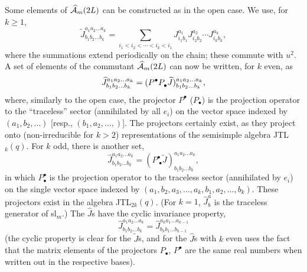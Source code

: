 \documentclass[twocolumn,floats,pra]{revtex4}
\def \hcA {\widehat{\cal A}}
\newcommand {\be}{\begin{equation}}
\newcommand {\ee} {\end{equation}}
\begin{document}
Some elements of $\hcA_m(2L)$ can be constructed as in the open
case. We use, for $k\geq 1$,
\be%
\widetilde{J}^{a_1a_2\ldots a_k}_{b_1b_2\ldots b_k}=\sum_{
i_1<i_2<\cdots <i_k<i_1} J_{i_1 b_1}^{a_1}J_{i_2
b_2}^{a_2}\cdots J_{i_k b_k}^{a_k}, \ee%
where the summations extend periodically on the chain; these
commute with $u^2$. A set of elements of the commutant
$\hcA_m(2L)$ can now be written, for $k$ even, as
\be%
\widehat{J}^{a_1a_2\ldots a_k}_{b_1b_2\ldots b_k}=(P^\bullet
P_{\bullet}^{\vphantom\bullet}
\widetilde{J})^{a_1a_2\ldots a_k}_{b_1b_2\ldots b_k},\ee%
where, similarly to the open case, the projector $P^\bullet$
($P_\bullet$) is the projection operator to the ``traceless''
sector (annihilated by all $e_i$) on the vector space indexed by
$(a_1,b_2,\ldots)$ [resp., $(b_1,a_2,\ldots,)$]. The projectors
certainly exist, as they project onto (non-irreducible for $k>2$)
representations of the semisimple algebra JTL$_{k}(q)$. For $k$
odd, there is another set,%
\be%
\widehat{J}^{a_1a_2\ldots a_k}_{b_1b_2\ldots
b_k}=(P^\bullet_{\;\bullet}
\widetilde{J})^{a_1a_2\ldots a_k}_{b_1b_2\ldots b_k},\ee%
in which $P^\bullet_\bullet$ is the projection operator to the
traceless sector (annihilated by $e_i$) on the single vector space
indexed by $(a_1,b_2,a_3,\ldots,a_k,b_1,a_2,\ldots,b_k)$. These
projectors exist in the algebra JTL$_{2k}(q)$. (For $k=1$,
$\widehat{J}^a_b$ is the traceless generator of sl$_m$.) The
$\widehat{J}$s have the cyclic invariance property,%
\be%
\widehat{J}^{a_1a_2\ldots a_k}_{b_1b_2\ldots
b_k}=\widehat{J}^{a_ka_1\ldots a_{k-1}}_{b_kb_1\ldots b_{k-1}}\ee%
(the cyclic property is clear for the $\widetilde{J}$s, and for
the $\widehat{J}$s with $k$ even uses the fact that the matrix
elements of the projectors $P_\bullet$, $P^\bullet$ are the same
real numbers when written out in the respective bases).
\end{document}
